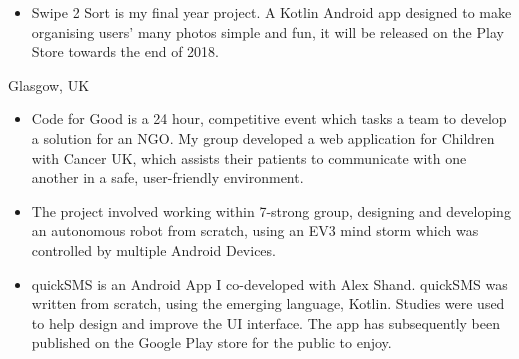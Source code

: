 \documentclass[9pt,a4paper]{altacv}
\begin{document}

\begin{itemize}
\item Swipe 2 Sort is my final year project. A Kotlin Android app designed to make organising users’ many photos simple and fun, it will be released on the Play Store towards the end of 2018.
\end{itemize}
\divider


  {Glasgow, UK}
\begin{itemize}
\item Code for Good is a 24 hour, competitive event which tasks a team to develop a solution for an NGO. My group developed a web application for Children with Cancer UK, which assists their patients to communicate with one another in a safe, user-friendly environment.
\end{itemize}
\divider


\begin{itemize}
\item The project involved working within 7-strong group, designing and developing an autonomous robot from scratch, using an EV3 mind storm which was controlled by multiple Android Devices.
\end{itemize}
\divider

\begin{itemize}
\item quickSMS is an Android App I co-developed with Alex Shand. quickSMS was written from scratch, using the emerging language, Kotlin. Studies were used to help design and improve the UI interface. The app has subsequently been published on the Google Play store for the public to enjoy.
\itemUser 
\end{itemize}
\divider
\end{document}
